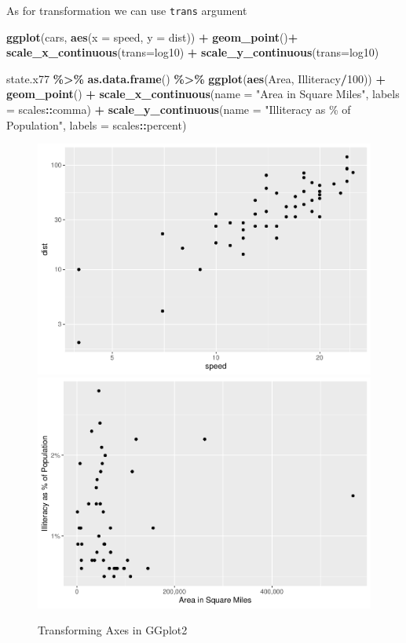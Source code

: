 \documentclass[
]{book}
\newenvironment{Shaded}{\begin{snugshade}}{\end{snugshade}}
\newcommand{\AttributeTok}[1]{\textcolor[rgb]{0.13,0.29,0.53}{#1}}
\newcommand{\DecValTok}[1]{\textcolor[rgb]{0.00,0.00,0.81}{#1}}
\newcommand{\FunctionTok}[1]{\textcolor[rgb]{0.13,0.29,0.53}{\textbf{#1}}}
\newcommand{\NormalTok}[1]{#1}
\newcommand{\SpecialCharTok}[1]{\textcolor[rgb]{0.81,0.36,0.00}{\textbf{#1}}}
\newcommand{\StringTok}[1]{\textcolor[rgb]{0.31,0.60,0.02}{#1}}
\begin{document}
As for transformation we can use \texttt{trans} argument

\begin{Shaded}
\begin{Highlighting}[]
\FunctionTok{ggplot}\NormalTok{(cars, }\FunctionTok{aes}\NormalTok{(}\AttributeTok{x =}\NormalTok{ speed, }\AttributeTok{y =}\NormalTok{ dist)) }\SpecialCharTok{+} 
  \FunctionTok{geom\_point}\NormalTok{()}\SpecialCharTok{+}
  \FunctionTok{scale\_x\_continuous}\NormalTok{(}\AttributeTok{trans=}\StringTok{\textquotesingle{}log10\textquotesingle{}}\NormalTok{) }\SpecialCharTok{+}
  \FunctionTok{scale\_y\_continuous}\NormalTok{(}\AttributeTok{trans=}\StringTok{\textquotesingle{}log10\textquotesingle{}}\NormalTok{)}

\NormalTok{state.x77 }\SpecialCharTok{\%\textgreater{}\%} 
  \FunctionTok{as.data.frame}\NormalTok{() }\SpecialCharTok{\%\textgreater{}\%} 
  \FunctionTok{ggplot}\NormalTok{(}\FunctionTok{aes}\NormalTok{(Area, Illiteracy}\SpecialCharTok{/}\DecValTok{100}\NormalTok{)) }\SpecialCharTok{+}
  \FunctionTok{geom\_point}\NormalTok{() }\SpecialCharTok{+}
  \FunctionTok{scale\_x\_continuous}\NormalTok{(}\AttributeTok{name =} \StringTok{"Area in Square Miles"}\NormalTok{, }\AttributeTok{labels =}\NormalTok{ scales}\SpecialCharTok{::}\NormalTok{comma) }\SpecialCharTok{+}
  \FunctionTok{scale\_y\_continuous}\NormalTok{(}\AttributeTok{name =} \StringTok{"Illiteracy as \% of Population"}\NormalTok{, }\AttributeTok{labels =}\NormalTok{ scales}\SpecialCharTok{::}\NormalTok{percent)}
\end{Highlighting}
\end{Shaded}

\begin{figure}

{\centering \includegraphics[width=0.49\linewidth]{DauR_files/figure-latex/scale2-1} \includegraphics[width=0.49\linewidth]{DauR_files/figure-latex/scale2-2} 

}

\caption{Transforming Axes in GGplot2}\label{fig:scale2}
\end{figure}
\end{document}
